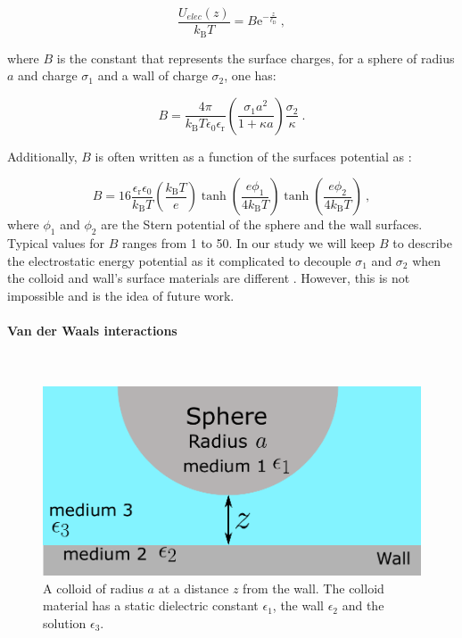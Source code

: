 \begin{equation}
	\frac{U_{elec}(z)}{k_\mathrm{B}T}  = B \mathrm{e}^{-\frac{z}{\ell_\mathrm{D}}}~,
	\label{Eq:Uelec}
\end{equation}

where $B$ is the constant that represents the surface charges, for a sphere of radius $a$ and charge $\sigma_1$ and a wall of charge $\sigma_2$, one has:

\begin{equation}
	B = \frac{4 \pi}{ k_\mathrm{B}T\epsilon_0 \epsilon_\mathrm{r}} \left( \frac{\sigma_1 a^2 }{1 + \kappa a}  \right) \frac{\sigma_2}{\kappa} ~.
\end{equation}

Additionally, $B$ is often written as a function of the surfaces potential as \cite{behrens_charge_2001}:

\begin{equation}
	B = 16  \frac{\epsilon_\mathrm{r} \epsilon_0}{k_\mathrm{B}T} \left(\frac{k_\mathrm{B}T}{e}\right) \tanh \left(\frac{e\phi_1}{4k_\mathrm{B}T}\right) \tanh \left(\frac{e\phi_2}{4k_\mathrm{B}T}\right) ~,
\end{equation}
where $\phi_1$ and $\phi_2$ are the Stern potential of the sphere and the wall surfaces. Typical values for $B$ ranges from 1 to 50. In our study we will keep $B$  to describe the electrostatic energy potential as it complicated to decouple $\sigma_1$ and $\sigma_2$ when the colloid and wall's surface materials are different \cite{behrens_charge_2001}. However, this is not impossible and is the idea of future work.

\paragraph{Van der Waals interactions}\mbox{}\\
\vspace{0.10cm}

\begin{figure}[h]
	\centering
	\includegraphics{02_body/chapter3/images/vdw_scheme.pdf}
	\caption{A colloid of radius $a$ at a distance $z$ from the wall. The colloid material has a static dielectric constant $\epsilon_1$, the wall $\epsilon_2$ and the solution $\epsilon_3$. }
	\label{Fig:vdw}
\end{figure}

